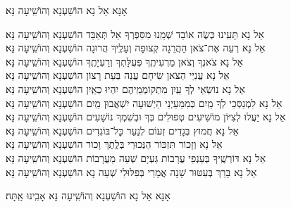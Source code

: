 \documentclass[twoside, openany, parskip=half, 11pt]{book}
\begin{document}
\begin{large}אָנָּא אֵל נָא הוֹשַׁעְנָא וְהוֹשִֽׁיעָה נָּא׃\end{large}

\begin{small}
	אֵל נָא תָּעִֽינוּ כְּשֶׂה אוֹבֵד שְׁמֵֽנוּ מִסִּפְרְךָ אַל תְּאַבֵּד \hfill הוֹשַׁעְנָא וְהוֹשִֽׁיעָה נָּא׃ \\
	אֵל נָא רְעֵה אֶת־צֹאן הַהֲרֵגָה קְצוּפָה וְעָלֶֽיךָ הֲרוּגָה \hfill הוֹשַׁעְנָא וְהוֹשִֽׁיעָה נָּא׃\\
	אֵל נָא צֹאנְךָ וְצֹאן מַרְעִיתֶֽךָ פְּעֻלָּתְךָ וְרַעְיָתֶֽךָ \hfill הוֹשַׁעְנָא וְהוֹשִֽׁיעָה נָּא׃\\
	אֵל נָא עֲנִיֵּי הַצֹּאן שִׂיחָם עֲנֵה בְּעֵת רָצוֹן \hfill הוֹשַׁעְנָא וְהוֹשִֽׁיעָה נָּא׃\\
	אֵל נָא נוֹשְׂאֵי לְךָ עַֽיִן מִתְקוֹמְמֵֽיהֶם יִהְיוּ כְאַֽיִן \hfill הוֹשַׁעְנָא וְהוֹשִֽׁיעָה נָּא׃\\
	אֵל נָא לִמְנַסְּכֵי לְךָ מַֽיִם כְּמִמַּעַיְנֵי הַיְשׁוּעָה יִשְׁאֲבוּן מַֽיִם \hfill הוֹשַׁעְנָא וְהוֹשִֽׁיעָה נָּא׃\\
	אֵל נָא יַעֲלוּ לְצִיּוֹן מוֹשִׁיעִים טְפוּלִים בְּךָ וּבְשִׁמְךָ נוֹשָׁעִים \hfill הוֹשַׁעְנָא וְהוֹשִֽׁיעָה נָּא׃\\
	אֵל נָא חֲמוּץ בְּגָדִים זְעוֹם לְנַעֵר כׇּל־בּוֹגְדִים \hfill הוֹשַׁעְנָא וְהוֹשִֽׁיעָה נָּא׃\\
	אֵל נָא וְזָכוֹר תִּזְכּוֹר הַנְּכוּרֵי בְּלֶֽתֶךְ וָכוֹר \hfill הוֹשַׁעְנָא וְהוֹשִֽׁיעָה נָּא׃\\
	אֵל נָא דּוֹרְשֶֽׁיךָ בְּעַנְפֵי עֲרָבוֹת גַּעְיָם שְׁעֵה מֵעֲרָבוֹת \hfill הוֹשַׁעְנָא וְהוֹשִֽׁיעָה נָּא׃\\
	אֵל נָא בָּרֵךְ בְּעִטּוּר שָׁנָה אֲמָרַי בְּפִלּוּלִי שְׁעֵה נָא \hfill הוֹשַׁעְנָא וְהוֹשִֽׁיעָה נָּא׃
	
\end{small}

\begin{large}אָנָּא אֵל נָא הוֹשַׁעְנָא וְהוֹשִֽׁיעָה נָּא אָבִֽינוּ אַֽתָּה׃\end{large}
\end{document}
